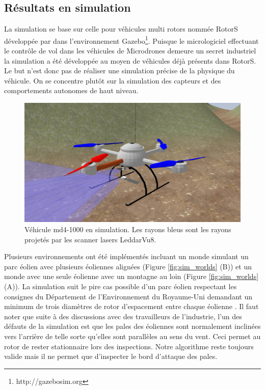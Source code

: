 \subsection{Résultats en simulation}
\label{subsec:results_simu}
La simulation se base sur celle pour véhicules multi rotors nommée RotorS développée par \citep{Furrer2016} dans l'environnement Gazebo\footnote{http://gazebosim.org}. Puisque le micrologiciel effectuant le contrôle de vol dans les véhicules de Microdrones demeure un secret industriel la simulation a été développée au moyen de véhicules déjà présents dans RotorS.
Le but n'est donc pas de réaliser une simulation précise de la physique du véhicule. On se concentre plutôt sur la simulation des capteurs et des comportements autonomes de haut niveau.

\begin{figure}[htp]
  \centering
    \centering
    \includegraphics[width=0.7\linewidth]{images/sim_vehicle_closeup.jpg}
  \caption{Véhicule md4-1000 en simulation. Les rayons bleus sont les rayons projetés par les scanner lasers LeddarVu8.}
  \label{fig:sim_vehicle_closeup}
\end{figure}

Plusieurs environnements ont été implémentés incluant un monde simulant un parc éolien avec plusieurs éoliennes alignées (Figure \ref{fig:sim_worlds} (B)) et un monde avec une seule éolienne avec un montagne au loin (Figure \ref{fig:sim_worlds} (A)). La simulation suit le pire cas possible d'un parc éolien respectant les consignes du Département de l'Environnement du Royaume-Uni demandant un minimum de trois diamètres de rotor d'espacement entre chaque éolienne \citep{DOE2009}. Il faut noter que suite à des discussions avec des travailleurs de l'industrie, l'un des défauts de la simulation est que les pales des éoliennes sont normalement inclinées vers l'arrière de telle sorte qu'elles sont parallèles au sens du vent. Ceci permet au rotor de rester stationnaire lors des inspections. Notre algorithme reste toujours valide mais il ne permet que d'inspecter le bord d'attaque des pales.

